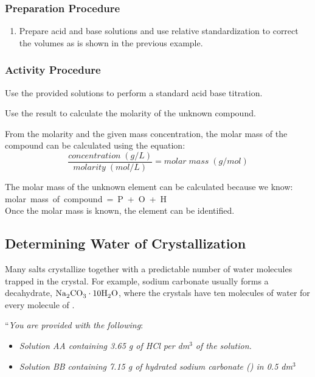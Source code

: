 \subsubsection{Preparation Procedure}
\begin{enumerate}
\item{Prepare acid and base solutions and use relative standardization to correct the volumes as is shown in the previous example.}
\end{enumerate}
\subsubsection{Activity Procedure}
\begin{enumerate}
\item{Use the provided solutions to perform a standard acid base titration.}
\item{Use the result to calculate the molarity of the unknown compound.}
\item{From the molarity and the given mass concentration, the molar mass of the compound can be calculated using the equation: 
$$\frac{concentration\;(g/L)}{molarity\;(mol/L)}={molar\;mass\;(g/mol)}$$
\item The molar mass of the unknown element can be calculated because we know:\\
molar~mass~of~compound~=~P~+~O~+~H~\\ 
Once the molar mass is known, the element can be identified.}
\end{enumerate}

\subsection{Determining Water of Crystallization}

Many salts crystallize together with a predictable number of water molecules trapped in the crystal. For example, sodium carbonate usually forms a decahydrate, $\ce{Na2CO3}\cdot10\ce{H2O}$, where the crystals have ten molecules of water for every molecule of . 
\bigskip

``\textit{You are provided with the following}:
\begin{itemize}
\item {\textit{Solution AA containing 3.65 g of HCl per dm$^3$ of the solution.}}
\item {\textit{Solution BB containing 7.15 g of hydrated sodium carbonate () in 0.5 dm$^3$}}
\end{itemize}

